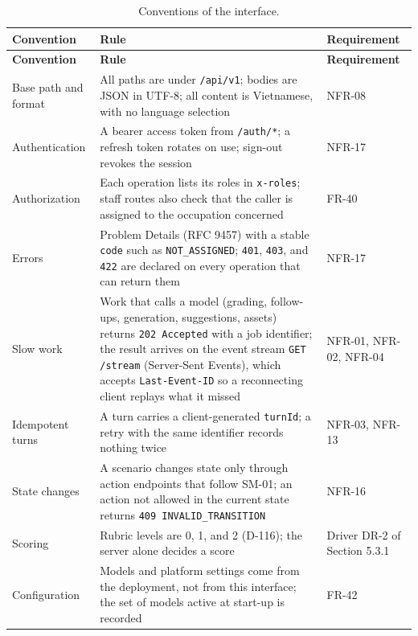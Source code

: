 {\small{}\renewcommand{\arraystretch}{1.1}
\begin{longtable}{|>{\raggedright\arraybackslash}p{}|>{\raggedright\arraybackslash}p{}|>{\raggedright\arraybackslash}p{}|}
\caption{Conventions of the interface.} \\
\hline
\textbf{Convention} & \textbf{Rule} & \textbf{Requirement} \\ \hline
\endfirsthead
\hline
\textbf{Convention} & \textbf{Rule} & \textbf{Requirement} \\ \hline
\endhead
Base path and format & All paths are under \texttt{/\allowbreak{}api/\allowbreak{}v1}; bodies are JSON in UTF-8; all content is Vietnamese, with no language selection & NFR-08 \\ \hline
Authentication & A bearer access token from \texttt{/\allowbreak{}auth/\allowbreak{}*}; a refresh token rotates on use; sign-out revokes the session & NFR-17 \\ \hline
Authorization & Each operation lists its roles in \texttt{x-\allowbreak{}roles}; staff routes also check that the caller is assigned to the occupation concerned & FR-40 \\ \hline
Errors & Problem Details (RFC 9457) with a stable \texttt{code} such as \texttt{NOT\_\allowbreak{}ASSIGNED}; \texttt{401}, \texttt{403}, and \texttt{422} are declared on every operation that can return them & NFR-17 \\ \hline
Slow work & Work that calls a model (grading, follow-ups, generation, suggestions, assets) returns \texttt{202 Accepted} with a job identifier; the result arrives on the event stream \texttt{GET /\allowbreak{}stream} (Server-\allowbreak{}Sent Events), which accepts \texttt{Last-\allowbreak{}Event-\allowbreak{}ID} so a reconnecting client replays what it missed & NFR-01, NFR-02, NFR-04 \\ \hline
Idempotent turns & A turn carries a client-\allowbreak{}generated \texttt{turnId}; a retry with the same identifier records nothing twice & NFR-03, NFR-13 \\ \hline
State changes & A scenario changes state only through action endpoints that follow SM-01; an action not allowed in the current state returns \texttt{409 INVALID\_\allowbreak{}TRANSITION} & NFR-16 \\ \hline
Scoring & Rubric levels are 0, 1, and 2 (D-116); the server alone decides a score & Driver DR-2 of Section 5.3.1 \\ \hline
Configuration & Models and platform settings come from the deployment, not from this interface; the set of models active at start-up is recorded & FR-42 \\ \hline
\end{longtable}
}

